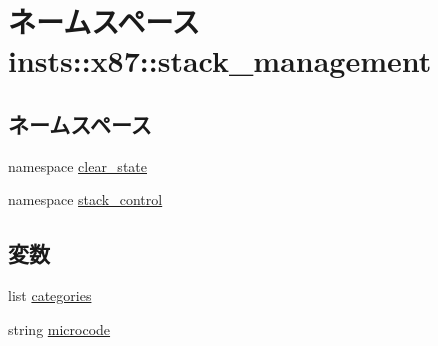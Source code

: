 \hypertarget{namespaceinsts_1_1x87_1_1stack__management}{
\section{ネームスペース insts::x87::stack\_\-management}
\label{namespaceinsts_1_1x87_1_1stack__management}
}
\subsection*{ネームスペース}
\begin{DoxyCompactItemize}
\item 
namespace \hyperlink{namespaceinsts_1_1x87_1_1stack__management_1_1clear__state}{clear\_\-state}
\item 
namespace \hyperlink{namespaceinsts_1_1x87_1_1stack__management_1_1stack__control}{stack\_\-control}
\end{DoxyCompactItemize}
\subsection*{変数}
\begin{DoxyCompactItemize}
\item 
list \hyperlink{namespaceinsts_1_1x87_1_1stack__management_a273cf0f1630af14c1582f05e53354a55}{categories}
\item 
string \hyperlink{namespaceinsts_1_1x87_1_1stack__management_a770f11a173e99389a8802f0107ed8f52}{microcode}
\end{DoxyCompactItemize}


